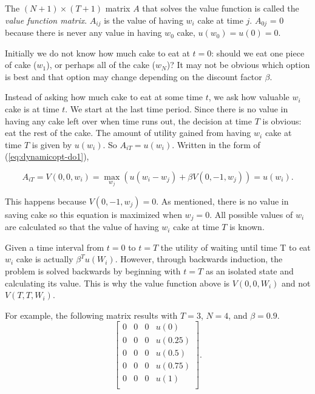 The $(N+1) \times (T+1)$ matrix $A$ that solves the value function is called the \emph{value function matrix}.
$A_{ij}$ is the value of having $w_i$ cake at time $j$.
$A_{0j}$ = 0 because there is never any value in having $w_0$ cake, $u(w_0) = u(0) = 0$.

Initially we do not know how much cake to eat at $t = 0$: should we eat one piece of cake ($w_1$), or perhaps all of the cake ($w_N$)?
It may not be obvious which option is best and that option may change depending on the discount factor $\beta$.

Instead of asking how much cake to eat at some time $t$, we ask how valuable $w_i$ cake is at time $t$.
We start at the last time period.
Since there is no value in having any cake left over when time runs out, the decision at time $T$ is obvious: eat the rest of the cake.
The amount of utility gained from having $w_i$ cake at time $T$ is given by $u(w_i)$.
So $A_{iT} = u(w_i)$.
Written in the form of (\ref{eq:dynamicopt-do1}),

\begin{equation}\label{eq:dynamicopt-do2}
A_{iT} = V(0, 0, w_{i}) = \max_{w_{j}} \left(u(w_{i} - w_{j}) + \beta V(0, -1, w_{j})\right) = u(w_{i}).
\end{equation}

This happens because $V(0,-1,w_j) = 0$.
As mentioned, there is no value in saving cake so this equation is maximized when $w_j = 0$.
All possible values of $w_{i}$ are calculated so that the value of having $w_i$ cake at time $T$ is known.

\begin{warn}
Given a time interval from $t=0$ to $t=T$ the utility of waiting until time T to eat $w_i$ cake is actually $\beta^Tu(W_{i})$.
However, through backwards induction, the problem is solved backwards by beginning with $t=T$ as an isolated state and calculating its value.
This is why the value function above is $V(0, 0, W_i)$ and not $V(T, T, W_i)$.
\end{warn}

For example, the following matrix results with $T=3$, $N=4$, and $\beta=0.9$.
\[
\begin{bmatrix}
0 & 0 & 0 & u(0) \\
0 & 0 & 0 & u(0.25) \\
0 & 0 & 0 & u(0.5) \\
0 & 0 & 0 & u(0.75) \\
0 & 0 & 0 & u(1) \\
\end{bmatrix}.
\]


